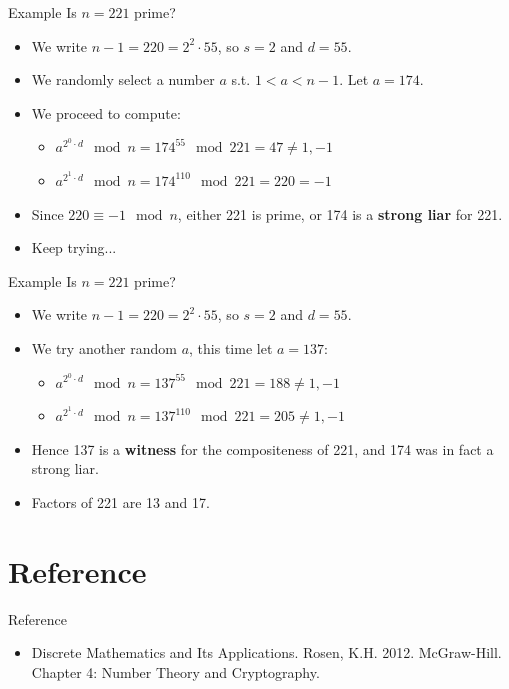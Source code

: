 \documentclass{beamer}
\begin{document}
\begin{frame}{Example}
Is $n = 221$ prime?
    \begin{itemize}
        \item We write $n - 1 = 220 = 2^2 \cdot 55$, so $s = 2$ and $d = 55$.
        \item We randomly select a number $a$ s.t. $1 < a < n - 1$. Let $a = 174$. 
        \item We proceed to compute:
        \begin{itemize}
            \item $a^{2^0 \cdot d} \mod n = 174^{55} \mod 221 = 47 \neq 1,- 1$
            \item $a^{2^1 \cdot d} \mod n = 174^{110} \mod 221 = 220 = -1$
        \end{itemize}
        \item Since $220 \equiv −1 \mod n$, either 221 is prime, or 174 is a \textbf{strong liar} for 221.
        \item Keep trying...
    \end{itemize}
\end{frame}

\begin{frame}{Example}
Is $n = 221$ prime?
    \begin{itemize}
        \item We write $n - 1 = 220 = 2^2 \cdot 55$, so $s = 2$ and $d = 55$.
        \item We try another random $a$, this time let $a = 137$:
        \begin{itemize}
            \item $a^{2^0 \cdot d} \mod n = 137^{55} \mod 221 = 188 \neq 1, -1$
            \item $a^{2^1 \cdot d} \mod n = 137^{110} \mod 221 = 205 \neq 1, -1$
        \end{itemize}
        \item Hence 137 is a \textbf{witness} for the compositeness of 221, and 174 was in fact a strong liar.
        \item Factors of 221 are 13 and 17.
    \end{itemize}
\end{frame}

\section*{Reference}

\begin{frame}{Reference}
    \begin{itemize}
        \item Discrete Mathematics and Its Applications. Rosen, K.H. 2012. McGraw-Hill. \\
        Chapter 4: Number Theory and Cryptography.
    \end{itemize}
\end{frame}
\end{document}
